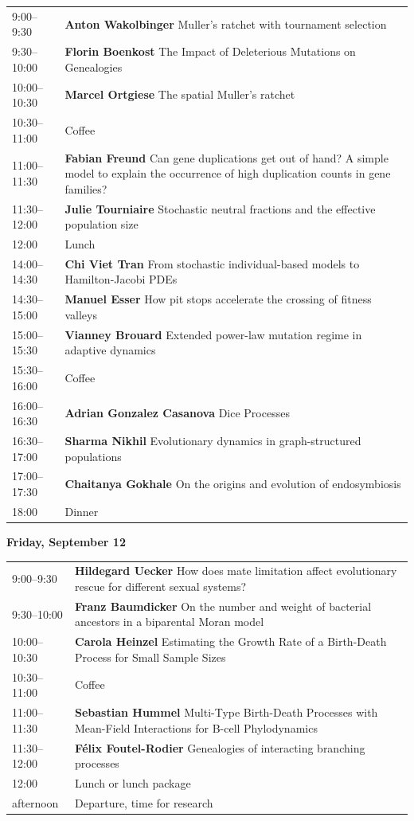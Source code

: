 \documentclass[12pt,a4paper]{article}
\begin{document}
\begin{tabular}{@{}l p{}@{}}
9:00--9:30 &\textbf{Anton Wakolbinger } Muller's ratchet with tournament selection \\
9:30--10:00 &\textbf{Florin Boenkost } The Impact of Deleterious Mutations on Genealogies \\
10:00--10:30 &\textbf{Marcel Ortgiese } The spatial Muller's ratchet \\
10:30--11:00 & Coffee \\
11:00--11:30 &\textbf{Fabian Freund } Can gene duplications get out of hand? A simple model to explain the occurrence of high duplication counts in gene families? \\
11:30--12:00 &\textbf{Julie Tourniaire } Stochastic neutral fractions and the effective population size \\
12:00 & Lunch \\
14:00--14:30 &\textbf{Chi Viet Tran } From stochastic individual-based models to Hamilton-Jacobi PDEs \\
14:30--15:00 &\textbf{Manuel Esser } How pit stops accelerate the crossing of fitness valleys \\
15:00--15:30 &\textbf{Vianney Brouard } Extended power-law mutation regime in adaptive dynamics \\
15:30--16:00 & Coffee \\
16:00--16:30 &\textbf{Adrian Gonzalez Casanova } Dice Processes \\
16:30--17:00 &\textbf{Sharma Nikhil } Evolutionary dynamics in graph-structured populations \\
17:00--17:30 &\textbf{Chaitanya Gokhale } On the origins and evolution of endosymbiosis \\
18:00 & Dinner \\
\end{tabular}

\newpage
\textbf{\Large Friday, September 12}\medskip

\begin{tabular}{@{}l p{}@{}}
9:00--9:30 &\textbf{Hildegard Uecker } How does mate limitation affect evolutionary rescue for different sexual systems? \\
9:30--10:00 &\textbf{Franz Baumdicker } On the number and weight of bacterial ancestors in a biparental Moran model \\
10:00--10:30 &\textbf{Carola Heinzel } Estimating the Growth Rate of a Birth-Death Process for Small Sample Sizes \\
10:30--11:00 & Coffee \\
11:00--11:30 &\textbf{Sebastian Hummel } Multi-Type Birth-Death Processes with Mean-Field Interactions for B-cell Phylodynamics \\
11:30--12:00 &\textbf{Félix Foutel-Rodier } Genealogies of interacting branching processes \\
12:00 & Lunch or lunch package \\
afternoon & Departure, time for research \\
\end{tabular}
\end{document}
